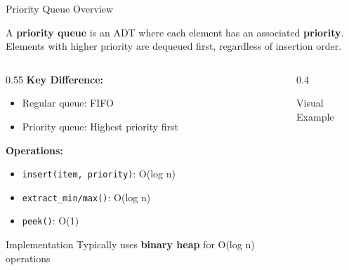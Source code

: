 \documentclass[aspectratio=169,xcolor=dvipsnames]{beamer}
\begin{document}
\begin{frame}[fragile]{Priority Queue Overview}
  \begin{definition}
    A \textbf{priority queue} is an ADT where each element has an associated \textbf{priority}. Elements with higher priority are dequeued first, regardless of insertion order.
  \end{definition}

  \vspace{0.3cm}

  \begin{columns}
    \begin{column}{0.55\textwidth}
      \textbf{Key Difference:}
      \begin{itemize}
        \item Regular queue: FIFO
        \item Priority queue: Highest priority first
      \end{itemize}

      \vspace{0.3cm}

      \textbf{Operations:}
      \begin{itemize}
        \item \texttt{insert(item, priority)}: O(log n)
        \item \texttt{extract\_min/max()}: O(log n)
        \item \texttt{peek()}: O(1)
      \end{itemize}

      \vspace{0.3cm}

      \begin{alertblock}{Implementation}
        Typically uses \textbf{binary heap} for O(log n) operations
      \end{alertblock}
    \end{column}
    \begin{column}{0.4\textwidth}
      \begin{exampleblock}{Visual Example}
\end{exampleblock}
\end{column}
\end{columns}
\end{frame}
\end{document}
